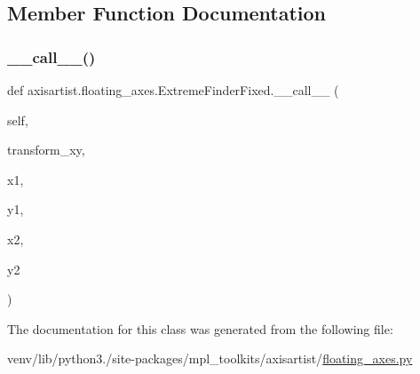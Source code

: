 \subsection{Member Function Documentation}
\mbox{\label{classaxisartist_1_1floating__axes_1_1ExtremeFinderFixed_a8c5733026d503d38dd489f3356a72269}} 
\subsubsection{\texorpdfstring{\+\_\+\+\_\+call\+\_\+\+\_\+()}{\_\_call\_\_()}}
{\footnotesize\ttfamily def axisartist.\+floating\+\_\+axes.\+Extreme\+Finder\+Fixed.\+\_\+\+\_\+call\+\_\+\+\_\+ (\begin{DoxyParamCaption}\item[{}]{self,  }\item[{}]{transform\+\_\+xy,  }\item[{}]{x1,  }\item[{}]{y1,  }\item[{}]{x2,  }\item[{}]{y2 }\end{DoxyParamCaption})}



The documentation for this class was generated from the following file\+:\begin{DoxyCompactItemize}
\item 
venv/lib/python3./site-\/packages/mpl\+\_\+toolkits/axisartist/\hyperlink{axisartist_2floating__axes_8py}{floating\+\_\+axes.\+py}\end{DoxyCompactItemize}
